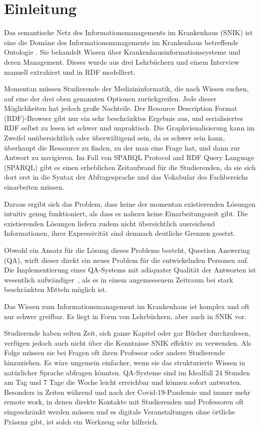 \documentclass[utf8,biblatex]{lni}
\begin{document}
%

\section{Einleitung}

Das semantische Netz des Informationsmanagements im Krankenhaus (SNIK) ist eine
die Domäne des Informationsmanagements im Krankenhaus betreffende Ontologie \cite{domaene}.
Sie behandelt Wissen über Krankenhausinformationssysteme und deren Management.
Dieses wurde aus drei Lehrbüchern \cite{bb,ob,he} und einem Interview \cite{ciosurvey} manuell extrahiert und in RDF modelliert.

Momentan müssen Studierende der Medizininformatik, die nach Wissen suchen, auf eine der drei oben genannten Optionen zurückgreifen.
Jede dieser Möglichkeiten hat jedoch große Nachteile.
Der Resource Description Format (RDF)-Browser gibt nur ein sehr beschränktes Ergebnis aus, und serialisiertes RDF selbst zu lesen ist schwer und unpraktisch.
Die Graphvisualisierung kann im Zweifel unübersichtlich oder überwältigend sein, da es schwer sein kann, überhaupt die Ressource zu finden, zu der man eine Frage hat, und dann zur Antwort zu navigieren.
Im Fall von SPARQL Protocol and RDF Query Language (SPARQL) gibt es einen erheblichen Zeitaufwand für die Studierenden, da sie sich dort erst in die Syntax der Abfragesprache und das Vokabular des Fachbereichs einarbeiten müssen.

Daraus ergibt sich das Problem, dass keine der momentan existierenden Lösungen intuitiv genug funktioniert, als dass es nahezu keine Einarbeitungszeit gibt.
Die existierenden Lösungen liefern zudem nicht übersichtlich ausreichend Informationen, ihrer Expressivität sind demnach deutliche Grenzen gesetzt.

Obwohl ein Ansatz für die Lösung dieses Problems besteht, Question Answering (QA), wirft dieser direkt ein neues Problem für die entwickelnden Personen auf.
Die Implementierung eines QA-Systems mit adäquater Qualität der Antworten ist wesentlich aufwändiger~\citep[S.~3]{qanswer}, als es in einem angemessenem Zeitraum bei stark beschränkten Mitteln möglich ist.

Das Wissen zum Informationsmanagement im Krankenhaus ist komplex und oft nur schwer greifbar.
Es liegt in Form von Lehrbüchern, aber auch in SNIK vor.

Studierende haben selten Zeit, sich ganze Kapitel oder gar Bücher durchzulesen, verfügen jedoch auch nicht über die Kenntnisse SNIK effektiv zu verwenden.
Als Folge müssen sie bei Fragen oft ihren Professor oder andere Studierende hinzuziehen.
Es wäre ungemein einfacher, wenn sie das strukturierte Wissen in natürlicher Sprache abfragen könnten.
QA-Systeme sind im Idealfall 24 Stunden am Tag und 7 Tage die Woche leicht erreichbar und können sofort antworten. 
Besonders in Zeiten während und nach der Covid-19-Pandemie und immer mehr remote work, in denen direkte Kontakte mit Studierenden und Professoren oft eingeschränkt werden müssen und es digitale Veranstaltungen ohne örtliche Präsenz gibt, ist solch ein Werkzeug sehr hilfreich.
\end{document}
